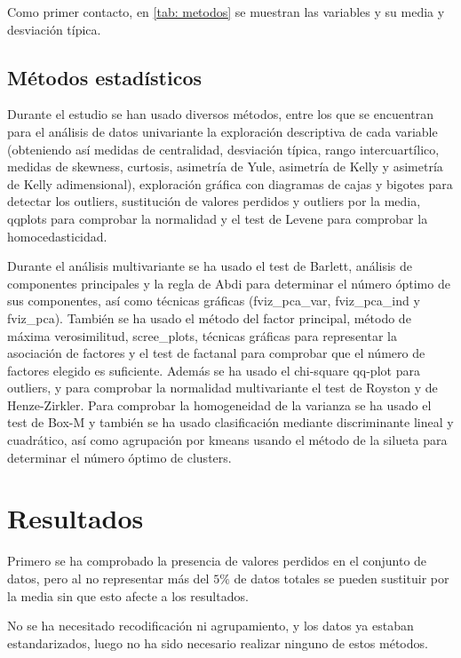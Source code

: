 \documentclass[twoside,openright,titlepage,numbers=noenddot,openany,headinclude,footinclude=true,
cleardoublepage=empty,abstractoff,BCOR=5mm,paper=a4,fontsize=12pt,main=spanish]{scrreprt}
\begin{document}
Como primer contacto, en \eqref{tab: metodos} se muestran las variables y su media y desviación típica.

\subsection{Métodos estadísticos}

Durante el estudio se han usado diversos métodos, entre los que se encuentran para el análisis de datos univariante la exploración descriptiva de cada variable (obteniendo así medidas de centralidad, desviación típica, rango intercuartílico, medidas de skewness, curtosis, asimetría de Yule, asimetría de Kelly y asimetría de Kelly adimensional), exploración gráfica con diagramas de cajas y bigotes para detectar los outliers, sustitución de valores perdidos y outliers por la media, qqplots para comprobar la normalidad y el test de Levene para comprobar la homocedasticidad.

Durante el análisis multivariante se ha usado el test de Barlett, análisis de componentes principales y la regla de Abdi para determinar el número óptimo de sus componentes, así como técnicas gráficas (fviz\_pca\_var, fviz\_pca\_ind y fviz\_pca). También se ha usado el método del factor principal, método de máxima verosimilitud, scree\_plots, técnicas gráficas para representar la asociación de factores y el test de factanal para comprobar que el número de factores elegido es suficiente. Además se ha usado el chi-square qq-plot para outliers, y para comprobar la normalidad multivariante el test de Royston y de Henze-Zirkler. Para comprobar la homogeneidad de la varianza se ha usado el test de Box-M y también se ha usado clasificación mediante discriminante lineal y cuadrático, así como agrupación por kmeans usando el método de la silueta para determinar el número óptimo de clusters.

\section{Resultados}

Primero se ha comprobado la presencia de valores perdidos en el conjunto de datos, pero al no representar más del $5\% $ de datos totales se pueden sustituir por la media sin que esto afecte a los resultados.

No se ha necesitado recodificación ni agrupamiento, y los datos ya estaban estandarizados, luego no ha sido necesario realizar ninguno de estos métodos.
\end{document}
